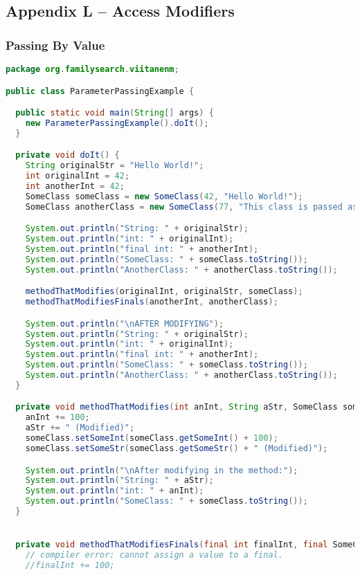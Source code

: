 \subsection*{Appendix L -- Access Modifiers}
\subsubsection{Passing By Value}\label{App:AppendixL}
\begin{lstlisting}[language=Java]
package org.familysearch.viitanenm;

public class ParameterPassingExample {

  public static void main(String[] args) {
    new ParameterPassingExample().doIt();
  }

  private void doIt() {
    String originalStr = "Hello World!";
    int originalInt = 42;
    int anotherInt = 42;
    SomeClass someClass = new SomeClass(42, "Hello World!");
    SomeClass anotherClass = new SomeClass(77, "This class is passed as final");

    System.out.println("String: " + originalStr);
    System.out.println("int: " + originalInt);
    System.out.println("final int: " + anotherInt);
    System.out.println("SomeClass: " + someClass.toString());
    System.out.println("AnotherClass: " + anotherClass.toString());

    methodThatModifies(originalInt, originalStr, someClass);
    methodThatModifiesFinals(anotherInt, anotherClass);

    System.out.println("\nAFTER MODIFYING");
    System.out.println("String: " + originalStr);
    System.out.println("int: " + originalInt);
    System.out.println("final int: " + anotherInt);
    System.out.println("SomeClass: " + someClass.toString());
    System.out.println("AnotherClass: " + anotherClass.toString());
  }

  private void methodThatModifies(int anInt, String aStr, SomeClass someClass) {
    anInt += 100;
    aStr += " (Modified)";
    someClass.setSomeInt(someClass.getSomeInt() + 100);
    someClass.setSomeStr(someClass.getSomeStr() + " (Modified)");

    System.out.println("\nAfter modifying in the method:");
    System.out.println("String: " + aStr);
    System.out.println("int: " + anInt);
    System.out.println("SomeClass: " + someClass.toString());
  }


  private void methodThatModifiesFinals(final int finalInt, final SomeClass finalClass) {
    // compiler error: cannot assign a value to a final.
    //finalInt += 100;


\end{lstlisting}
